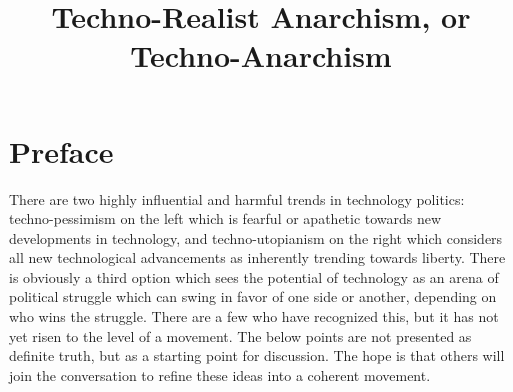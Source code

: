 \documentclass{article}
\begin{document}
\title{Techno-Realist Anarchism, or Techno-Anarchism}
\author{}
\date{}
\maketitle

\section{Preface}

There are two highly influential and harmful trends in technology politics: techno-pessimism on the left which is fearful or apathetic towards new developments in technology, and techno-utopianism on the right which considers all new technological advancements as inherently trending towards liberty. There is obviously a third option which sees the potential of technology as an arena of political struggle which can swing in favor of one side or another, depending on who wins the struggle. There are a few who have recognized this, but it has not yet risen to the level of a movement. The below points are not presented as definite truth, but as a starting point for discussion. The hope is that others will join the conversation to refine these ideas into a coherent movement.
\end{document}
